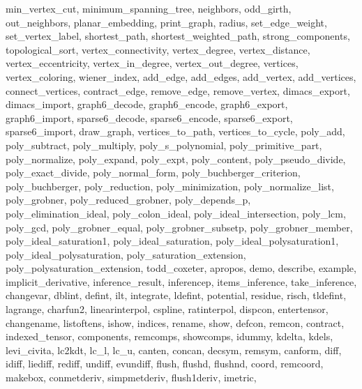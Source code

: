 {{    min_vertex_cut,
    minimum_spanning_tree,
    neighbors,
    odd_girth,
    out_neighbors,
    planar_embedding,
    print_graph,
    radius,
    set_edge_weight,
    set_vertex_label,
    shortest_path,
    shortest_weighted_path,
    strong_components,
    topological_sort,
    vertex_connectivity,
    vertex_degree,
    vertex_distance,
    vertex_eccentricity,
    vertex_in_degree,
    vertex_out_degree,
    vertices,
    vertex_coloring,
    wiener_index,
    add_edge,
    add_edges,
    add_vertex,
    add_vertices,
    connect_vertices,
    contract_edge,
    remove_edge,
    remove_vertex,
    dimacs_export,
    dimacs_import,
    graph6_decode,
    graph6_encode,
    graph6_export,
    graph6_import,
    sparse6_decode,
    sparse6_encode,
    sparse6_export,
    sparse6_import,
    draw_graph,
    vertices_to_path,
    vertices_to_cycle,
    poly_add,
    poly_subtract,
    poly_multiply,
    poly_s_polynomial,
    poly_primitive_part,
    poly_normalize,
    poly_expand,
    poly_expt,
    poly_content,
    poly_pseudo_divide,
    poly_exact_divide,
    poly_normal_form,
    poly_buchberger_criterion,
    poly_buchberger,
    poly_reduction,
    poly_minimization,
    poly_normalize_list,
    poly_grobner,
    poly_reduced_grobner,
    poly_depends_p,
    poly_elimination_ideal,
    poly_colon_ideal,
    poly_ideal_intersection,
    poly_lcm,
    poly_gcd,
    poly_grobner_equal,
    poly_grobner_subsetp,
    poly_grobner_member,
    poly_ideal_saturation1,
    poly_ideal_saturation,
    poly_ideal_polysaturation1,
    poly_ideal_polysaturation,
    poly_saturation_extension,
    poly_polysaturation_extension,
    todd_coxeter,
    apropos,
    demo,
    describe,
    example,
    implicit_derivative,
    inference_result,
    inferencep,
    items_inference,
    take_inference,
    changevar,
    dblint,
    defint,
    ilt,
    integrate,
    ldefint,
    potential,
    residue,
    risch,
    tldefint,
    lagrange,
    charfun2,
    linearinterpol,
    cspline,
    ratinterpol,
    dispcon,
    entertensor,
    changename,
    listoftens,
    ishow,
    indices,
    rename,
    show,
    defcon,
    remcon,
    contract,
    indexed_tensor,
    components,
    remcomps,
    showcomps,
    idummy,
    kdelta,
    kdels,
    levi_civita,
    lc2kdt,
    lc_l,
    lc_u,
    canten,
    concan,
    decsym,
    remsym,
    canform,
    diff,
    idiff,
    liediff,
    rediff,
    undiff,
    evundiff,
    flush,
    flushd,
    flushnd,
    coord,
    remcoord,
    makebox,
    conmetderiv,
    simpmetderiv,
    flush1deriv,
    imetric,
}}
